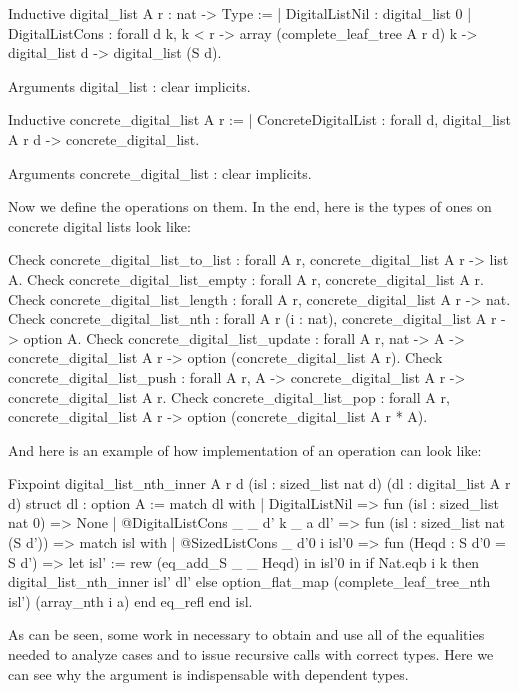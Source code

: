 \documentclass{article}
\begin{document}
\begin{coq}
Inductive digital_list {A r} : nat -> Type :=
  | DigitalListNil : digital_list 0
  | DigitalListCons :
      forall {d} k,
      k < r ->
      array (complete_leaf_tree A r d) k ->
      digital_list d ->
      digital_list (S d).

Arguments digital_list : clear implicits.

Inductive concrete_digital_list {A r} :=
  | ConcreteDigitalList : forall d, digital_list A r d -> concrete_digital_list.

Arguments concrete_digital_list : clear implicits.
\end{coq}

Now we define the operations on them. In the end, here is the types of ones on concrete digital lists look like:

\begin{coq}
Check concrete_digital_list_to_list : forall {A} {r}, concrete_digital_list A r -> list A.
Check concrete_digital_list_empty : forall {A} {r}, concrete_digital_list A r.
Check concrete_digital_list_length : forall {A} {r}, concrete_digital_list A r -> nat.
Check concrete_digital_list_nth : forall {A} {r} (i : nat), concrete_digital_list A r -> option A.
Check concrete_digital_list_update : forall {A} {r}, nat -> A -> concrete_digital_list A r ->
  option (concrete_digital_list A r).
Check concrete_digital_list_push : forall {A} {r}, A -> concrete_digital_list A r -> concrete_digital_list A r.
Check concrete_digital_list_pop : forall {A} {r}, concrete_digital_list A r ->
  option (concrete_digital_list A r * A).
\end{coq} \pagebreak%

And here is an example of how implementation of an operation can look like:

\begin{coq}
Fixpoint digital_list_nth_inner {A r d} (isl : sized_list nat d) (dl : digital_list A r d)
  {struct dl} : option A :=
  match dl with
  | DigitalListNil => fun (isl : sized_list nat 0) =>
    None
  | @DigitalListCons _ _ d' k _ a dl' => fun (isl : sized_list nat (S d')) =>
    match isl with
    | @SizedListCons _ d'0 i isl'0 => fun (Heqd : S d'0 = S d') =>
      let isl' := rew (eq_add_S _ _ Heqd) in isl'0 in
      if Nat.eqb i k
      then digital_list_nth_inner isl' dl'
      else option_flat_map (complete_leaf_tree_nth isl') (array_nth i a)
    end eq_refl
  end isl.
\end{coq}

As can be seen, some work in necessary to obtain and use all of the equalities needed to analyze cases and to issue recursive calls with correct types. Here we can see why the  argument is indispensable with dependent types.
\end{document}
